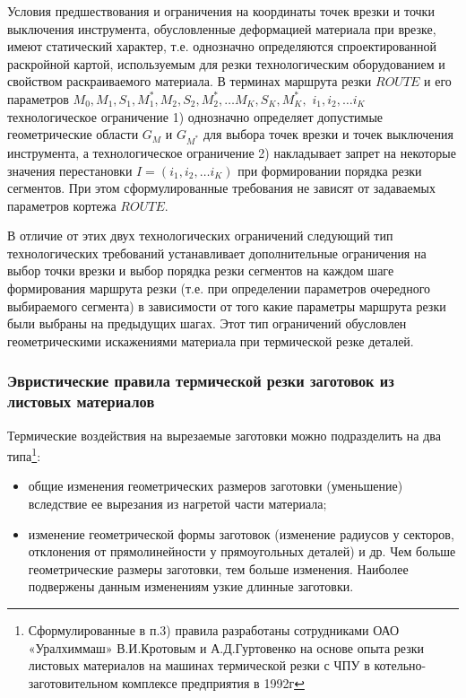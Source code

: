 \documentclass{article}
\begin{document}
Условия предшествования и ограничения на координаты точек врезки
и точки выключения инструмента,
обусловленные деформацией материала при врезке,
имеют статический характер,
т.е. однозначно определяются спроектированной раскройной картой,
используемым для резки технологическим оборудованием
и свойством раскраиваемого материала.
В терминах маршрута резки $ROUTE$
и его параметров
$M_0, M_1, S_1, M_1^*, M_2, S_2, M_2^*, \dots M_K, S_K, M_K^*,$
$i_1, i_2, \dots i_K$
технологическое ограничение
1) однозначно определяет допустимые геометрические области
$G_M$
и
$G_{M^*}$
для выбора точек врезки и точек выключения инструмента,
а технологическое ограничение
2) накладывает запрет на некоторые значения перестановки
$ I = (i_1, i_2, \dots i_K)$
при формировании порядка резки сегментов. При
этом сформулированные требования не зависят от задаваемых параметров кортежа
$ROUTE$.

В отличие от этих двух технологических ограничений
следующий тип технологических требований устанавливает
дополнительные ограничения на выбор точки врезки и выбор
порядка резки сегментов на каждом шаге формирования маршрута резки
(т.е. при определении параметров очередного выбираемого сегмента)
в зависимости от того какие параметры маршрута резки были выбраны на предыдущих шагах.
Этот тип ограничений обусловлен геометрическими
искажениями материала при термической резке деталей.

\subsubsection{Эвристические правила термической резки заготовок из листовых материалов}

Термические воздействия на вырезаемые заготовки можно подразделить на два типа\footnote{
  Сформулированные в п.3)
  правила разработаны сотрудниками ОАО «Уралхиммаш»
  В.И.Кротовым и А.Д.Гуртовенко на основе опыта
  резки листовых материалов на машинах термической резки с ЧПУ
  в котельно-заготовительном комплексе предприятия в 1992г
}:

\begin{itemize}
\item общие изменения геометрических размеров заготовки (уменьшение)
вследствие ее вырезания из нагретой части материала;
\item	изменение геометрической формы заготовок
(изменение радиусов у секторов,
отклонения от прямолинейности у прямоугольных деталей) и др.
Чем больше геометрические размеры заготовки,
тем больше изменения.
Наиболее  подвержены данным изменениям узкие длинные заготовки.
\end{itemize}
\end{document}

